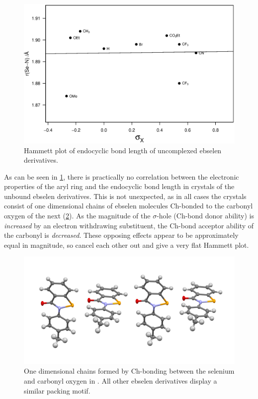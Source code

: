 \begin{figure}
    \centering
    \includegraphics[width=0.9\linewidth]{Figures/hammett-endo-free.eps}
    \caption{Hammett plot of endocyclic  bond length of uncomplexed ebselen derivatives.}
    \label{fig:hammett-endo-free}
\end{figure}

As can be seen in \ref{fig:hammett-endo-free}, there is practically no correlation between the electronic properties of the aryl ring and the endocyclic  bond length in crystals of the unbound ebselen derivatives.
This is not unexpected, as in all cases the crystals consist of one dimensional chains of ebselen molecules Ch-bonded to the carbonyl oxygen of the next (\ref{fig:ebs-packing}).
As the magnitude of the $\sigma$-hole (Ch-bond donor ability) is \emph{increased} by an electron withdrawing substituent, the Ch-bond acceptor ability of the carbonyl is \emph{decreased}.
These opposing effects appear to be approximately equal in magnitude, so cancel each other out and give a very flat Hammett plot.

\begin{figure}
    \centering
    \includegraphics[width=0.6\linewidth]{Figures/ebs.me-packing.png}
    \caption{One dimensional chains formed by Ch-bonding between the selenium and carbonyl oxygen in . All other ebselen derivatives display a similar packing motif.}
    \label{fig:ebs-packing}
\end{figure}

